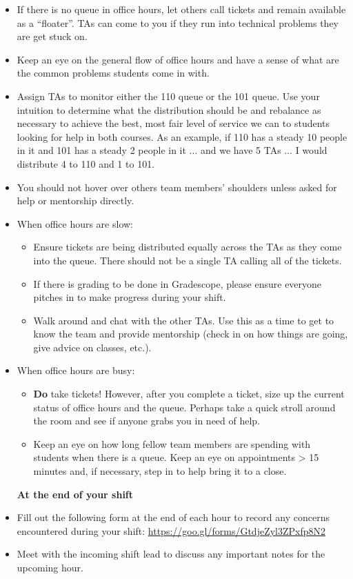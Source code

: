 \documentclass[a4paper]{article}
\begin{document}
\begin{itemize}
\item If there is no queue in office hours, let others call tickets and remain available as a “floater”. TAs can come to you if they run into technical problems they are get stuck on.
\item Keep an eye on the general flow of office hours and have a sense of what are the common problems students come in with.
\item Assign TAs to monitor either the 110 queue or the 101 queue. Use your intuition to determine what the distribution should be and rebalance as necessary to achieve the best, most fair level of service we can to students looking for help in both courses. As an example, if 110 has a steady 10 people in it and 101 has a steady 2 people in it ... and we have 5 TAs ... I would distribute 4 to 110 and 1 to 101.
\item You should not hover over others team members’ shoulders unless asked for help or mentorship directly.
\item When office hours are slow: 
\begin{itemize}
\item Ensure tickets are being distributed equally across the TAs as they come into the queue. There should not be a single TA calling all of the tickets.
\item If there is grading to be done in Gradescope, please ensure everyone pitches in to make progress during your shift.
\item Walk around and chat with the other TAs. Use this as a time to get to know the team and provide mentorship (check in on how things are going, give advice on classes, etc.).
\end{itemize}
\item When office hours are busy:
\begin{itemize}
\item \textbf{Do} take tickets! However, after you complete a ticket, size up the current status of office hours and the queue. Perhaps take a quick stroll around the room and see if anyone grabs you in need of help.
\item Keep an eye on how long fellow team members are spending with students when there is a queue. Keep an eye on appointments > 15 minutes and, if necessary, step in to help bring it to a close.
\end{itemize}
\textbf{At the end of your shift}
\item Fill out the following form at the end of each hour to record any concerns encountered during your shift: \href{https://goo.gl/forms/GtdjeZyl3ZPxfp8N2}{https://goo.gl/forms/GtdjeZyl3ZPxfp8N2}
\item Meet with the incoming shift lead to discuss any important notes for the upcoming hour.
\end{itemize}
\end{document}
